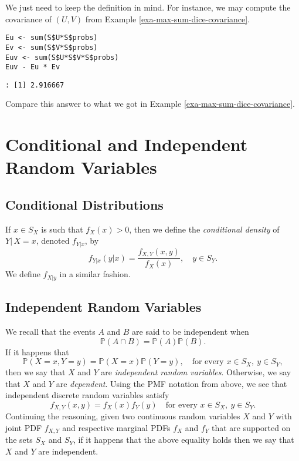 We just need to keep the definition in mind.
For
instance, we may compute the covariance of \((U,V)\) from Example
\ref{exa-max-sum-dice-covariance}.

\begin{Verbatim}
Eu <- sum(S$U*S$probs)
Ev <- sum(S$V*S$probs)
Euv <- sum(S$U*S$V*S$probs)
Euv - Eu * Ev
\end{Verbatim}

\begin{verbatim}
: [1] 2.916667
\end{verbatim}

Compare this answer to what we got in Example \ref{exa-max-sum-dice-covariance}.

\section{Conditional and Independent Random Variables}
\label{sec-7-3}

\subsection{Conditional Distributions}

If \(x\in S_{X}\) is such that \(f_{X}(x)>0\), then we define the
\emph{conditional density} of \(Y|\, X=x\), denoted \(f_{Y|x}\), by
\begin{equation}
f_{Y|x}(y|x)=\frac{f_{X,Y}(x,y)}{f_{X}(x)},\quad y\in S_{Y}.
\end{equation}
We define \(f_{X|y}\) in a similar fashion.

\subsection{Independent Random Variables}
\label{sec-7-4-1}

We recall that the events \(A\) and \(B\) are
said to be independent when
\begin{equation}
\mathbb{P}(A\cap B)=\mathbb{P}(A)\mathbb{P}(B).
\end{equation}
If it happens that
\begin{equation}
\mathbb{P}(X=x,Y=y)=\mathbb{P}(X=x)\mathbb{P}(Y=y),\quad \mbox{for every }x\in S_{X},\ y\in S_{Y},
\end{equation}
then we say that \(X\) and \(Y\) are \emph{independent random
variables}. Otherwise, we say that \(X\) and \(Y\) are
\emph{dependent}. Using the PMF notation from above, we see that
independent discrete random variables satisfy
\begin{equation}
f_{X,Y}(x,y)=f_{X}(x)f_{Y}(y)\quad \mbox{for every }x\in S_{X},\ y\in S_{Y}.
\end{equation}
Continuing the reasoning, given two continuous random variables \(X\)
and \(Y\) with joint PDF \(f_{X,Y}\) and respective marginal PDFs
\(f_{X}\) and \(f_{Y}\) that are supported on the sets \(S_{X}\) and
\(S_{Y}\), if it happens that
the above equality holds
then we say that \(X\) and \(Y\) are independent.

